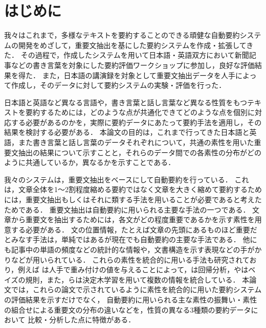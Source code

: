 


\maketitle
\thispagestyle{empty}
\section{はじめに}

我々はこれまで，多様なテキストを要約することのできる頑健な自動要約システムの開発をめざして，重要文抽出を基にした要約システムを作成・拡張してきた．
その過程で，作成したシステムを用いて日本語・英語双方において新聞記事などの書き言葉を対象にした要約評価ワークショップに参加し，良好な評価結果を得た\cite{nobata:tsc2001,sekine:duc2001}．
また，日本語の講演録を対象として重要文抽出データを人手によって作成し，そのデータに対して要約システムの実験・評価を行った\cite{nobata:orc2002}．

日本語と英語など異なる言語や，書き言葉と話し言葉など異なる性質をもつテキストを要約するためには，どのような点が共通化できてどのような点を個別に対応する必要があるのかを，実際に要約データにあたって要約手法を適用し，その結果を検討する必要がある．
本論文の目的は，これまで行ってきた日本語と英語，また書き言葉と話し言葉のデータそれぞれについて，共通の素性を用いた重要文抽出の結果について示すことと，それらのデータ間での各素性の分布がどのように共通しているか，異なるかを示すことである．

我々のシステムは，重要文抽出をベースにして自動要約を行っている．
これは，文章全体を1〜2割程度縮める要約ではなく文章を大きく縮めて要約するためには，重要文抽出もしくはそれに類する手法を用いることが必要であると考えたためである．
重要文抽出は自動要約に用いられる主要な手法の一つである\cite{mani:aats,okumura:nlp1999-07}．
文章から重要文を抽出するためには，各文がどの程度重要であるかを示す素性を用意する必要がある．
文の位置情報，たとえば文章の先頭にあるものほど重要だとみなす手法は，単純ではあるが現在でも自動要約の主要な手法である．
他にも記事中の単語の頻度などの統計的な情報や，文書構造を示す表現などの手がかりなどが用いられている．
これらの素性を統合的に用いる手法も研究されており，例えば
\cite{edmundson:acm1969}は人手で重み付けの値を与えることによって，\cite{watanabe:coling1996}は回帰分析，\cite{kupiec:sigir1995-s}や\cite{aone:colingacl1998}はベイズの規則，また\cite{nomoto:ipsj1997}，\cite{lin:cikm1999}らは決定木学習を用いて複数の情報を統合している．
本論文では，これらの論文で示されているように素性を統合的に用いた要約システムの評価結果を示すだけでなく，
自動要約に用いられる主な素性の振舞い・素性の組合せによる重要文の分布の違いなどを，性質の異なる3種類の要約データにおいて
比較・分析した点に特徴がある．

